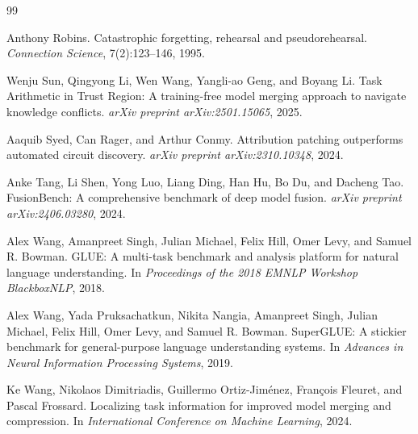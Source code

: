 \documentclass{article} %
\begin{document}
\begin{thebibliography}{99}

Anthony Robins.
\newblock Catastrophic forgetting, rehearsal and pseudorehearsal.
\newblock \emph{Connection Science}, 7(2):123--146, 1995.

Wenju Sun, Qingyong Li, Wen Wang, Yangli-ao Geng, and Boyang Li.
\newblock Task Arithmetic in Trust Region: A training-free model merging approach to navigate knowledge conflicts.
\newblock \emph{arXiv preprint arXiv:2501.15065}, 2025.

Aaquib Syed, Can Rager, and Arthur Conmy.
\newblock Attribution patching outperforms automated circuit discovery.
\newblock \emph{arXiv preprint arXiv:2310.10348}, 2024.

Anke Tang, Li Shen, Yong Luo, Liang Ding, Han Hu, Bo Du, and Dacheng Tao.
\newblock FusionBench: A comprehensive benchmark of deep model fusion.
\newblock \emph{arXiv preprint arXiv:2406.03280}, 2024.

Alex Wang, Amanpreet Singh, Julian Michael, Felix Hill, Omer Levy, and Samuel R. Bowman.
\newblock GLUE: A multi-task benchmark and analysis platform for natural language understanding.
\newblock In \emph{Proceedings of the 2018 EMNLP Workshop BlackboxNLP}, 2018.

Alex Wang, Yada Pruksachatkun, Nikita Nangia, Amanpreet Singh, Julian Michael, Felix Hill, Omer Levy, and Samuel R. Bowman.
\newblock SuperGLUE: A stickier benchmark for general-purpose language understanding systems.
\newblock In \emph{Advances in Neural Information Processing Systems}, 2019.

Ke Wang, Nikolaos Dimitriadis, Guillermo Ortiz-Jim\'enez, Fran\c{c}ois Fleuret, and Pascal Frossard.
\newblock Localizing task information for improved model merging and compression.
\newblock In \emph{International Conference on Machine Learning}, 2024.


\end{thebibliography}
\end{document}
